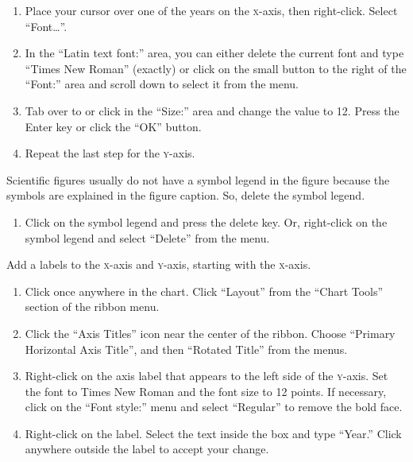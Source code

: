 \documentclass[12pt, hidelinks]{exam}
\newcommand*\axis[1]{{\scshape #1}-axis}
\begin{document}
\begin{questions}
\begin{enumerate}[resume]
	\item Place your cursor over one of the years on the \axis{x}, then right-click. Select “Font\dots”.
	
	\item In the “Latin text font:” area, you can either delete the current font and type “Times New Roman” (exactly) or click on the small button to the right of the “Font:” area and scroll down to select it from the menu. 
	
	\item Tab over to or click in the “Size:” area and change the value to 12. Press the Enter key or click the “OK” button.
	
	\item Repeat the last step for the \axis{y}.
\end{enumerate}

Scientific figures usually do not have a symbol legend in the figure because the symbols are explained in the figure caption. So, delete the symbol legend.  

\begin{enumerate}[resume]
	\item Click on the symbol legend and press the delete key. Or, right-click on the symbol legend and select “Delete” from the menu.
\end{enumerate}

Add a labels to the \axis{x} and \axis{y}, starting with the \axis{x}.

\begin{enumerate}[resume]
	\item Click once anywhere in the chart. Click “Layout” from the “Chart Tools” section of the ribbon menu. 
	
	\item Click the “Axis Titles” icon near the center of the ribbon. Choose “Primary Horizontal Axis Title”, and then “Rotated Title” from the menus.
	
	\item Right-click on the axis label that appears to the left side of the \axis{y}. Set the font to Times New Roman and the font size to 12 points. If necessary, click on the “Font style:” menu and select “Regular” to remove the bold face.
	
	\item Right-click on the label. Select the text inside the box and type “Year.” Click anywhere outside the label to accept your change.
	

\end{enumerate}
\end{questions}
\end{document}
